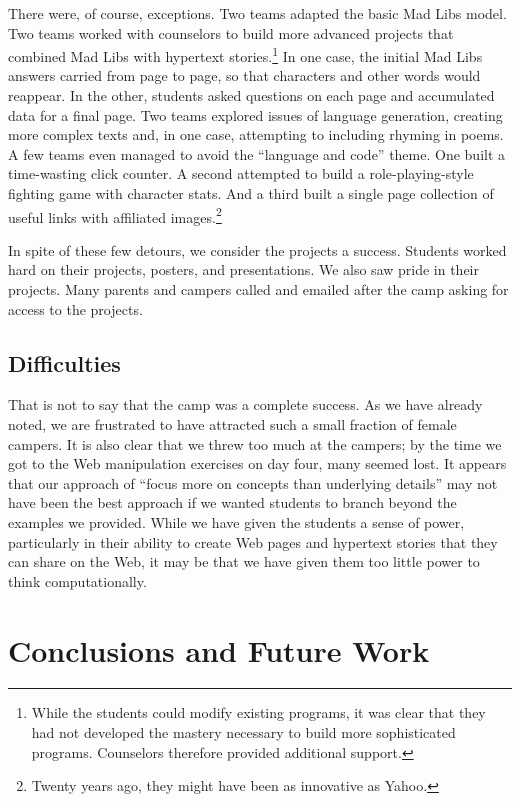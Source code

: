 There were, of course, exceptions.  Two teams adapted the basic Mad
Libs model.  Two teams worked with counselors to build more advanced
projects that combined Mad Libs with hypertext stories.\footnote{While
the students could modify existing programs, it was clear that they
had not developed the mastery necessary to build more sophisticated
programs.  Counselors therefore provided additional support.}
In one case, the initial Mad Libs answers carried from page to page,
so that characters and other words would reappear.  In the other,
students asked questions on each page and accumulated data for a
final page.  Two teams explored issues of language generation,
creating more complex texts and, in one case, attempting to including
rhyming in poems.  
A few teams even managed to avoid the ``language and code'' theme.
One built a time-wasting click counter.  A second attempted to build
a role-playing-style fighting game with character stats.  And a
third built a single page collection of useful links with affiliated
images.\footnote{Twenty years ago, they might have been as
innovative as Yahoo.}

In spite of these few detours, we consider the projects a success.
Students worked hard on their projects, posters, and presentations.
We also saw pride in their projects.  Many parents and campers
called and emailed after the camp asking for access to the projects.

\subsection{Difficulties}

That is not to say that the camp was a complete success.  As we
have already noted, we are frustrated to have attracted such a small
fraction of female campers.  It is also clear that we threw too
much at the campers; by the time we got to the Web manipulation
exercises on day four, many seemed lost.  It appears that our
approach of ``focus more on concepts than underlying details'' may
not have been the best approach if we wanted students to branch
beyond the examples we provided.  While we have given the students
a sense of power, particularly in their ability to create Web pages
and hypertext stories that they can share on the Web, it may be
that we have given them too little power to think computationally.

\section{Conclusions and Future Work}

